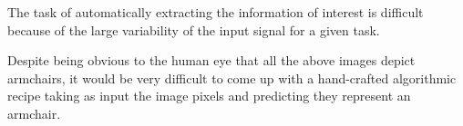\documentclass[c,8pt]{beamer}
\begin{document}
\begin{frame}
{  %




  The task of automatically extracting the information of interest is
  difficult because of the large variability of the input signal for a
  given task.

  Despite being obvious to the human eye that all the above images
  depict armchairs, it would be very difficult to come up with a
  hand-crafted algorithmic recipe taking as input the image pixels and
  predicting they represent an armchair.

}

\end{frame}

\end{document}
